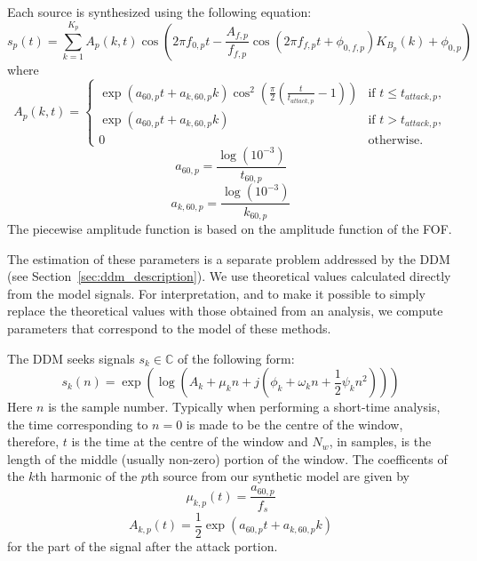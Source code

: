 \documentclass[letterpaper,12pt]{report}
\begin{document}
Each source is synthesized using the following equation:
\begin{equation}
    s_{p}(t) = \sum_{k=1}^{K_{p}} A_{p}(k,t) \cos(2\pi
    f_{0,p}t - \frac{A_{f,p}}{f_{f,p}} \cos(2\pi f_{f,p} t +
    \phi_{0,f,p}) K_{B_{p}}(k) + \phi_{0,p})
\end{equation}
where
\begin{equation}
    A_{p}(k,t) = 
    \begin{cases}
        \exp(a_{60,p} t + a_{k,60,p}k) \cos^{2}
        (\frac{\pi}{2}(\frac{t}{t_{attack,p}} - 1)) & \text{if } t \leq
        t_{attack,p},\\
        \exp(a_{60,p} t + a_{k,60,p}k) & \text{if } t > t_{attack,p},\\
        0 & \text{otherwise}.
    \end{cases}
\end{equation}
\begin{equation}
    a_{60,p} = \frac{\log(10^{-3})}{t_{60,p}}
\end{equation}
\begin{equation}
    a_{k,60,p} = \frac{\log(10^{-3})}{k_{60,p}} 
\end{equation}
The piecewise amplitude function is based on the amplitude function of the FOF.

The estimation of these parameters is a separate problem addressed by the
DDM (see Section~\ref{sec:ddm_description}). We use theoretical values calculated
directly from the model signals. For interpretation, and to make it possible to
simply replace the theoretical values with those obtained from an analysis, we
compute parameters that correspond to the model of these methods.

The DDM seeks signals $s_k \in \mathbb{C}$ of the following form:
\begin{equation}
    s_{k}(n) = \exp(\log(A_{k} + \mu_{k}n + j(\phi_{k} + \omega_{k}n +
    \frac{1}{2} \psi_{k} n^{2}))) \label{eq:rm_model}
\end{equation}
Here $n$ is the sample number. Typically when performing a short-time analysis,
the time corresponding to $n = 0$ is made to be the centre of the window,
therefore, $t$ is the time at the centre of the window and $N_{w}$, in samples,
is the length of the middle (usually non-zero) portion of the window. The
coefficents of the $k$th harmonic of the $p$th source from our synthetic model
are given by
\begin{equation}
    \mu_{k,p}(t) = \frac{a_{60,p}}{f_{s}}
\end{equation}
\begin{equation}
    A_{k,p}(t) = \frac{1}{2} \exp(a_{60,p} t + a_{k,60,p} k)
\end{equation}
for the part of the signal after the attack portion.
\end{document}
